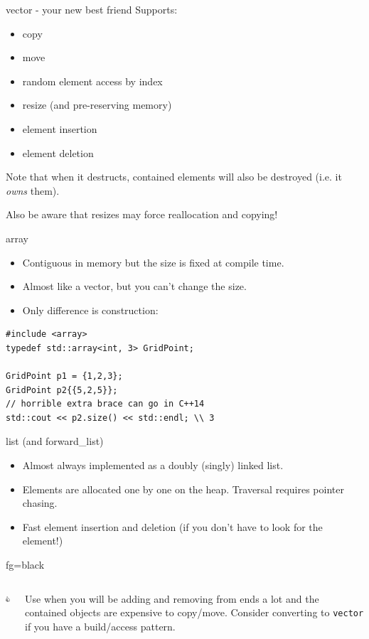 \documentclass[presentation,t]{beamer}
\newcommand{\code}[1]{\lstinline!#1!}
\newcommand{\thumb}[1]{
  \vfill{}
  \begin{beamercolorbox}{fg=black}
    \begin{columns}[c,onlytextwidth]
      \begin{column}{0.07\textwidth}
        \includegraphics[width=1em]{thumbs_up}
      \end{column}
      \begin{column}{0.93\textwidth}
        #1
      \end{column}
    \end{columns}
  \end{beamercolorbox}
}
\begin{document}
\begin{frame}{vector - your new best friend}
  Supports:
  \begin{itemize}
  \item copy
  \item move
  \item random element access by index
  \item resize (and pre-reserving memory)
  \item element insertion
  \item element deletion
  \end{itemize}
  Note that when it destructs, contained elements will also be
  destroyed (i.e. it \emph{owns} them).
  
  Also be aware that resizes may force reallocation and copying!
\end{frame}

\begin{frame}[fragile]{array}
  \begin{itemize}
  \item Contiguous in memory but the size is fixed at compile time.

  \item Almost like a vector, but you can't change the size.

  \item Only difference is construction:
  \end{itemize}

\begin{lstlisting}
#include <array>
typedef std::array<int, 3> GridPoint;

GridPoint p1 = {1,2,3};
GridPoint p2{{5,2,5}};
// horrible extra brace can go in C++14
std::cout << p2.size() << std::endl; \\ 3

\end{lstlisting}

\end{frame}

\begin{frame}{list (and forward\_list)}
  \begin{itemize}
  \item Almost always implemented as a doubly (singly) linked list.
  
  \item Elements are allocated one by one on the heap.  Traversal
    requires pointer chasing.

  \item Fast element insertion and deletion (if you don't have to look
    for the element!)
  \end{itemize}
  \thumb{Use when you will be adding and removing from ends a lot and
    the contained objects are expensive to copy/move. Consider
    converting to \code{vector} if you have a build/access pattern.}
\end{frame}
\end{document}
